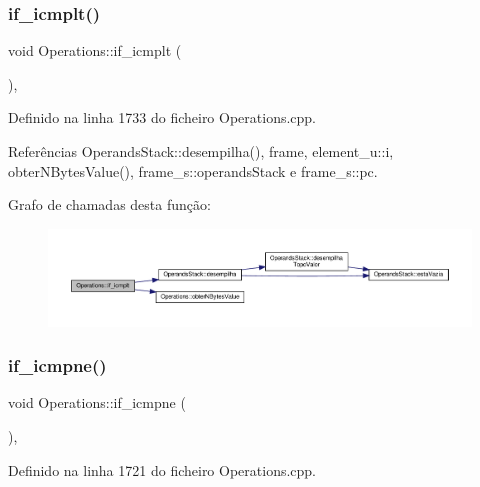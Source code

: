 \subsubsection{\texorpdfstring{if\+\_\+icmplt()}{if\_icmplt()}}
{\footnotesize\ttfamily void Operations\+::if\+\_\+icmplt (\begin{DoxyParamCaption}{ }\end{DoxyParamCaption})\hspace{0.3cm}{\ttfamily [static]}, {\ttfamily [private]}}



Definido na linha 1733 do ficheiro Operations.\+cpp.



Referências Operands\+Stack\+::desempilha(), frame, element\+\_\+u\+::i, obter\+N\+Bytes\+Value(), frame\+\_\+s\+::operands\+Stack e frame\+\_\+s\+::pc.

Grafo de chamadas desta função\+:
\nopagebreak
\begin{figure}[H]
\begin{center}
\leavevmode
\includegraphics[width=350pt]{classOperations_a06f624059cfada3f4a726d0482078aaa_cgraph}
\end{center}
\end{figure}
\mbox{\label{classOperations_a52dca630766e37bbaf0e7439c0335273}} 
\subsubsection{\texorpdfstring{if\+\_\+icmpne()}{if\_icmpne()}}
{\footnotesize\ttfamily void Operations\+::if\+\_\+icmpne (\begin{DoxyParamCaption}{ }\end{DoxyParamCaption})\hspace{0.3cm}{\ttfamily [static]}, {\ttfamily [private]}}



Definido na linha 1721 do ficheiro Operations.\+cpp.



